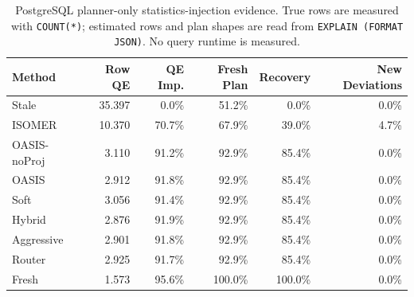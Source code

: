 \begin{table}[t]
  \centering
  \small
  \caption{PostgreSQL planner-only statistics-injection evidence. True rows are measured with \texttt{COUNT(*)}; estimated rows and plan shapes are read from \texttt{EXPLAIN (FORMAT JSON)}. No query runtime is measured.}
  \label{tab:postgres_planner_stats_injection}
  \setlength{\tabcolsep}{4pt}
  \begin{tabular}{lrrrrr}
    \toprule
    Method & Row QE & QE Imp. & Fresh Plan & Recovery & New Deviations \\
    \midrule
    Stale & 35.397 & 0.0\% & 51.2\% & 0.0\% & 0.0\% \\
    ISOMER & 10.370 & 70.7\% & 67.9\% & 39.0\% & 4.7\% \\
    OASIS-noProj & 3.110 & 91.2\% & 92.9\% & 85.4\% & 0.0\% \\
    OASIS & 2.912 & 91.8\% & 92.9\% & 85.4\% & 0.0\% \\
    Soft & 3.056 & 91.4\% & 92.9\% & 85.4\% & 0.0\% \\
    Hybrid & 2.876 & 91.9\% & 92.9\% & 85.4\% & 0.0\% \\
    Aggressive & 2.901 & 91.8\% & 92.9\% & 85.4\% & 0.0\% \\
    Router & 2.925 & 91.7\% & 92.9\% & 85.4\% & 0.0\% \\
    Fresh & 1.573 & 95.6\% & 100.0\% & 100.0\% & 0.0\% \\
    \bottomrule
  \end{tabular}
\end{table}
